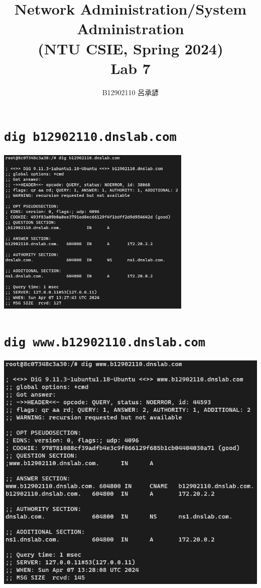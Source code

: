 \documentclass[12pt, a4paper]{article}
\title{
  \vspace{-1cm}
  Network Administration/System Administration\\
  (NTU CSIE, Spring 2024)\\
  Lab 7
}
\author{\Large B12902110 呂承諺}
\begin{document}
  \maketitle

  \section{\texttt{dig b12902110.dnslab.com}}
  \includegraphics[width=0.7\textwidth]{24-04-07_21-27-38_WindowsTerminal_Dvs2y4N9ZB.png}

  \section{\texttt{dig www.b12902110.dnslab.com}}
  \includegraphics[width=0.7\linewidth]{24-04-07_21-28-17_WindowsTerminal_BDto3LTRs0}
\end{document}
